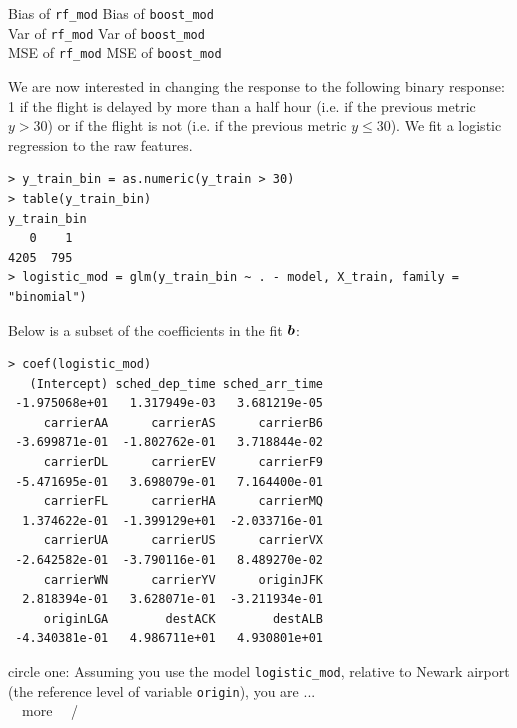 \documentclass[12pt]{article}
\begin{document}
\begin{enumerate}[(aa)]
Bias of \texttt{rf\_mod}   \iftoggle{solutions}{\inred{$?$}}{~\line(1,0){15}~}      Bias of \texttt{boost\_mod} \\

Var of \texttt{rf\_mod}   \iftoggle{solutions}{\inred{$?$}}{~\line(1,0){15}~}     Var of \texttt{boost\_mod} \\

MSE of \texttt{rf\_mod}   \iftoggle{solutions}{\inred{$?$}}{~\line(1,0){15}~}     MSE of \texttt{boost\_mod}

\pagebreak


We are now interested in changing the response to the following binary response: 1 if the flight is delayed by more than a half hour (i.e. if the previous metric $y > 30$) or if the flight is not (i.e. if the previous metric $y \leq 30$). We fit a logistic regression to the raw features. 

\begin{Verbatim}[fontsize=\small]
> y_train_bin = as.numeric(y_train > 30)
> table(y_train_bin)
y_train_bin
   0    1 
4205  795
> logistic_mod = glm(y_train_bin ~ . - model, X_train, family = "binomial")
\end{Verbatim}

Below is a subset of the coefficients in the fit $\boldsymbol{b}$:

\begin{Verbatim}[fontsize=\small]
> coef(logistic_mod)
   (Intercept) sched_dep_time sched_arr_time 
 -1.975068e+01   1.317949e-03   3.681219e-05 
     carrierAA      carrierAS      carrierB6 
 -3.699871e-01  -1.802762e-01   3.718844e-02 
     carrierDL      carrierEV      carrierF9 
 -5.471695e-01   3.698079e-01   7.164400e-01 
     carrierFL      carrierHA      carrierMQ 
  1.374622e-01  -1.399129e+01  -2.033716e-01 
     carrierUA      carrierUS      carrierVX 
 -2.642582e-01  -3.790116e-01   8.489270e-02 
     carrierWN      carrierYV      originJFK 
  2.818394e-01   3.628071e-01  -3.211934e-01  
     originLGA        destACK        destALB 
 -4.340381e-01   4.986711e+01   4.930801e+01 
\end{Verbatim}


 circle one: Assuming you use the model \texttt{logistic\_mod}, relative to Newark airport (the reference level of variable \texttt{origin}), you are ... \\

~~more~~ / ~~\iftoggle{solutions}{\inred{less}}{less}~~ \\ 


\end{enumerate}
\end{document}
